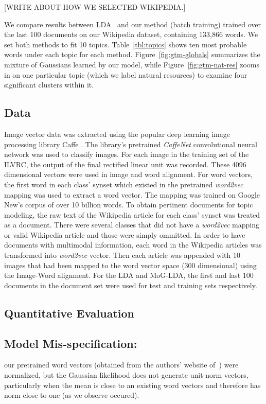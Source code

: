 \documentclass[11pt]{article}
\begin{document}
[WRITE ABOUT HOW WE SELECTED WIKIPEDIA.]

We compare results between LDA~\cite{Blei03} and our method (batch training) trained over the last 100 documents on our Wikipedia dataset, containing 133,866 words. We set both methods to fit 10 topics. Table~\ref{tbl:topics} shows ten most probable words under each topic for each method. Figure~\ref{fig:gtm-globals} summarizes the mixture of Gaussians learned by our model, while Figure~\ref{fig:gtm-nat-res} zooms in on one particular topic (which we label natural resources) to examine four significant clusters within it.

\subsection{Data}
\label{sec:data}
Image vector data was extracted using the popular deep learning image processing library Caffe \cite{Jia14}. The library's pretrained \textit{CaffeNet} convolutional neural network was used to classify images. For each image in the training set of the ILVRC, the output of the final rectified linear unit was recorded. These 4096 dimensional vectors were used in image and word alignment. For word vectors, the first word in each class' synset which existed in the pretrained \textit{word2vec} \cite{Mikolov13a} mapping was used to extract a word vector. The mapping was trained on Google New's corpus of over 10 billion words. To obtain pertinent documents for topic modeling, the raw text of the Wikipedia article for each class' synset was treated as a document. There were several classes that did not have a \textit{word2vec} mapping or valid Wikipedia article and those were simply ommitted. In order to have documents with multimodal information, each word in the Wikipedia articles was transformed into \textit{word2vec} vector. Then each article was appended with 10 images that had been mapped to the word vector space (300 dimensional) using the Image-Word alignment. For the LDA and MoG-LDA, the first and last 100 documents in the document set were used for test and training sets respectively.

\subsection{Quantitative Evaluation}

\subsection{Model Mis-specification:}
\label{sec:misspec}
our pretrained word vectors (obtained from the authors' website of~\cite{Mikolov13a}) were normalized, but the Gaussian likelihood does not generate unit-norm vectors, particularly when the mean is close to an existing word vectors and therefore has norm close to one (as we observe occured). 
\end{document}
